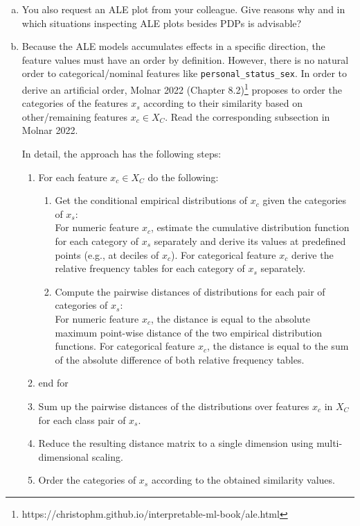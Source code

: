 {\begin{enumerate}[a)]
\item You also request an ALE plot from your colleague. 
Give reasons why and in which situations inspecting ALE plots besides PDPs is advisable?

\item 
Because the ALE models accumulates effects in a specific direction, the feature values must have an order by definition. However, there is no natural order to categorical/nominal features like \texttt{personal\_status\_sex}. 
In order to derive an artificial order, Molnar 2022 (Chapter 8.2)\footnote{https://christophm.github.io/interpretable-ml-book/ale.html} proposes to order the categories of the features $x_s$ according to their similarity based on other/remaining features $x_c \in X_C$. 
Read the corresponding subsection in Molnar 2022.

In detail, the approach has the following steps: 
\begin{enumerate}[1)]
  \item For each feature $x_c \in X_C$ do the following: 
  \begin{enumerate}
    \item Get the conditional empirical distributions of $x_c$ given the categories of $x_s$: \\
     For numeric feature $x_c$, estimate the cumulative distribution function for each category of $x_s$ separately and derive its values at predefined points (e.g., at deciles of $x_c$). 
     For categorical feature $x_c$ derive the relative frequency tables for each category of $x_s$ separately.
    \item Compute the pairwise distances of distributions for each pair of categories of $x_s$:\\ 
    For numeric feature $x_c$, the distance is equal to the absolute maximum point-wise distance of the two empirical distribution functions. For categorical feature $x_c$, the distance is equal to the sum of the absolute difference of both relative frequency tables.   
  \end{enumerate}
  \item end for
  \item Sum up the pairwise distances of the distributions over features $x_c$ in $X_C$ for each class pair of $x_s$. 
  \item Reduce the resulting distance matrix to a single dimension using multi-dimensional scaling.
  \item Order the categories of $x_s$ according to the obtained similarity values.
\end{enumerate}


\end{enumerate}}
